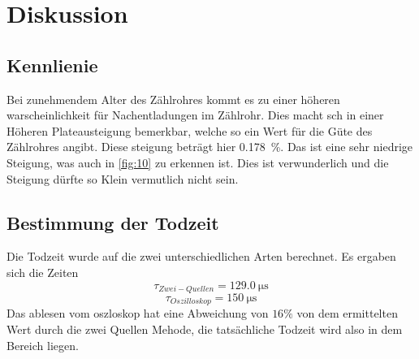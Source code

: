 \section{Diskussion}
\label{sec:Diskussion}
\subsection{Kennlienie}
Bei zunehmendem Alter des Zählrohres kommt es zu einer höheren warscheinlichkeit 
für Nachentladungen im Zählrohr. Dies macht sch in einer Höheren Plateausteigung 
bemerkbar, welche so ein Wert für die Güte des Zählrohres angibt.
Diese steigung beträgt hier \qty{0.178}{\%}. Das ist eine sehr niedrige Steigung, was auch 
in \autoref{fig:10} zu erkennen ist. Dies ist verwunderlich und die Steigung 
dürfte so Klein vermutlich nicht sein.

\subsection{Bestimmung der Todzeit}
Die Todzeit wurde auf die zwei unterschiedlichen Arten berechnet.
Es ergaben sich die Zeiten 
\begin{equation}
    \tau_{Zwei-Quellen} = \qty{129.0}{\micro\second} 
\end{equation}
\begin{equation}
    \tau_{Oszilloskop} = \qty{150}{\micro\second} 
\end{equation}
Das ablesen vom oszloskop hat eine Abweichung von $16 \%$ von dem 
ermittelten Wert durch die zwei Quellen Mehode, die tatsächliche 
Todzeit wird also in dem Bereich liegen.

